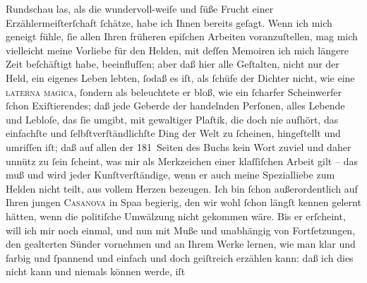 \begin{ledgroupsized}[t]{13cm}
                  Rundschau las, als die wundervoll-weiſe und ſüße Frucht einer
               Erzählermeiſterſchaft ſchätze, habe ich Ihnen bereits geſagt. Wenn ich mich geneigt
               fühle, ſie allen Ihren früheren epiſchen Arbeiten voranzuſtellen, mag mich vielleicht
               meine Vorliebe für den Helden, mit deſſen Memoiren ich mich längere Zeit beſchäftigt
               habe, beeinfluſſen; aber daß hier alle Geſtalten, nicht nur der Held, ein eigenes
               Leben lebten, ſodaß es iſt, als ſchüfe der Dichter nicht, wie eine \textsc{laterna magica}, ſondern als beleuchtete er bloß, wie ein
               ſcharfer Scheinwerfer ſchon Exiſtierendes; daß jede Geberde der handelnden Perſonen,
               alles {\pb}Lebende und Lebloſe, das ſie
               umgibt, mit gewaltiger Plaſtik, die doch nie aufhört, das einfachſte und
               ſelbſtverſtändlichſte Ding der Welt zu ſcheinen, hingeſtellt und umriſſen iſt; daß
               auf allen der 181 Seiten des Buchs kein Wort zuviel und daher unnütz zu ſein ſcheint, was mir als
               Merkzeichen einer klaſſiſchen Arbeit gilt – das muß und wird jeder Kunſtverſtändige,
               wenn er auch meine Spezialliebe zum Helden nicht teilt, aus vollem Herzen bezeugen.
               Ich bin ſchon außerordentlich auf Ihren jungen \textsc{Casanova} in Spaa begierig, den wir wohl ſchon längſt kennen gelernt hätten, wenn die politiſche
               Umwälzung nicht gekommen wäre. Bis er erſcheint, will ich mir noch einmal, und nun
               mit Muße und unabhängig von Fortſetzungen, den gealterten Sünder vornehmen und an
               Ihrem Werke lernen, wie man klar und farbig und ſpannend und einfach und doch
               geiſtreich erzählen kann: daß ich dies nicht kann und niemals können werde, iſt

\end{ledgroupsized}

